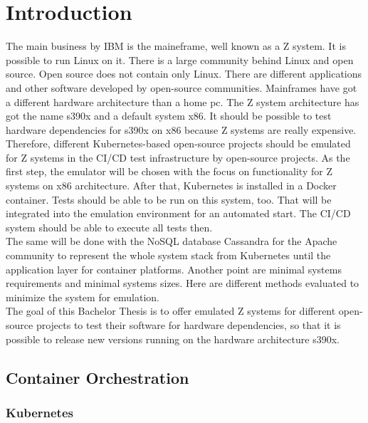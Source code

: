 \chapter{Introduction}\label{ch:intro}

The main business by IBM is the maineframe, well known as a Z system. It is possible to run Linux on it. There is a large community behind Linux and open source. Open source does not contain only Linux. There are different applications and other software developed by open-source communities. Mainframes have got a different hardware architecture than a home pc. The Z system architecture has got the name s390x and a default system x86. It should be possible to test hardware dependencies for s390x on x86 because Z systems are really expensive. Therefore, different Kubernetes-based open-source projects should be emulated for Z systems in the CI/CD test infrastructure by open-source projects. As the first step, the emulator will be chosen with the focus on functionality for Z systems on x86 architecture. After that, Kubernetes is installed in a Docker container. Tests should be able to be run on this system, too. That will be integrated into the emulation environment for an automated start. The CI/CD system should be able to execute all tests then. \\
The same will be done with the NoSQL database Cassandra for the Apache community to represent the whole system stack from Kubernetes until the application layer for container platforms. Another point are minimal systems requirements and minimal systems sizes. Here are different methods evaluated to minimize the system for emulation. \\
The goal of this Bachelor Thesis is to offer emulated Z systems for different open-source projects to test their software for hardware dependencies, so that it is possible to release new versions running on the hardware architecture s390x.

\blindtext

\section{Container Orchestration}

\blindtext

\subsection{Kubernetes}

